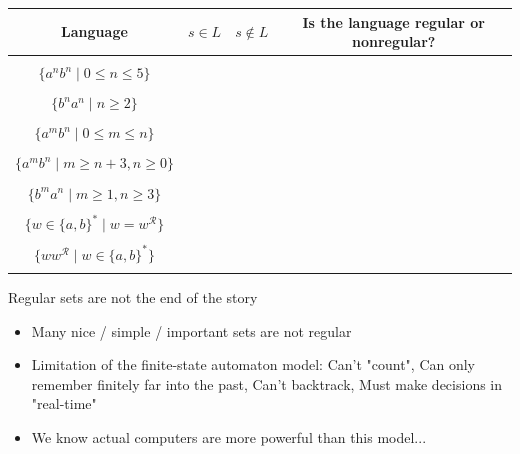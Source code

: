

\begin{center}
    \begin{tabular}{c|c| c| c}
    Language & $s \in L$ & $s \notin L$ & Is the language regular or nonregular?  \\
    \hline
     & \hspace{1in} & \hspace{1in}  &  \\
    $\{a^nb^n \mid 0  \leq n  \leq 5 \}$ & & & \\
     & & & \\
    $\{b^n a^n \mid  n  \geq 2\}$  & & & \\
     & & & \\
    $\{a^m b^n \mid  0 \leq m\leq n\}$  & & & \\
     & & & \\
    $\{a^m b^n \mid  m \geq n+3,  n \geq 0\}$  & & & \\
     & & & \\
    $\{b^m a^n \mid  m \geq 1, n \geq  3\}$  & & & \\
     & & & \\
    $\{ w  \in \{a,b\}^* \mid w = w^\mathcal{R} \}$ & & & \\
     & & & \\ 
    $\{ ww^\mathcal{R} \mid w\in \{a,b\}^* \}$ & & & \\
     & & & \\ 
    \end{tabular}
\end{center}
    
\newpage
Regular sets are not the end of the story
\begin{itemize}
    \item Many nice / simple / important sets are not regular
    \item Limitation of the finite-state automaton model: Can't "count", Can only remember finitely far into the past,
    Can't backtrack, Must make decisions in "real-time"
    \item We know actual computers are more powerful than this model...
\end{itemize}

